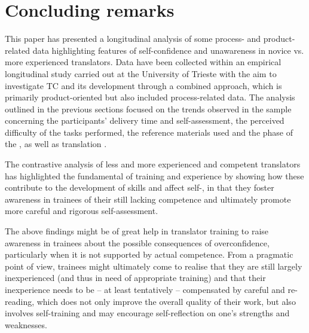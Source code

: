 \documentclass[output=paper]{LSP/langsci}
\begin{document}
\section{Concluding remarks}

This paper has presented a longitudinal analysis of some process- and product-related data highlighting features of self-confidence and unawareness in novice vs. more experienced translators. Data have been collected within an empirical longitudinal study carried out at the University of Trieste with the aim to investigate TC and its development through a combined approach, which is primarily product-oriented but also included process-related data. The analysis outlined in the previous sections focused on the trends observed in the sample concerning the participants' delivery time and self-assessment, the perceived difficulty of the tasks performed, the reference materials used and the  phase of the , as well as translation .

The contrastive analysis of less and more experienced and competent translators has highlighted the fundamental of training and experience by showing how these contribute to the development of  skills and affect self-, in that they foster awareness in trainees of their still lacking competence and ultimately promote more careful  and rigorous self-assessment.

The above findings might be of great help in translator training to raise awareness in trainees about the possible consequences of overconfidence, particularly when it is not supported by actual competence. From a pragmatic point of view, trainees might ultimately come to realise that they are still largely inexperienced (and thus in need of appropriate training) and that their inexperience needs to be -- at least tentatively -- compensated by careful  and re-reading, which does not only improve the overall quality of their work, but also involves self-training and may encourage self-reflection on one's strengths and weaknesses.

\sloppy
\printbibliography[heading=subbibliography,notkeyword=this]
\end{document}
